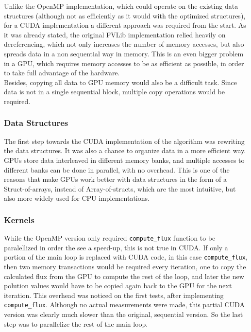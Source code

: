\documentclass[9pt,twocolumn]{scrartcl}
\begin{document}
Unlike the OpenMP implementation, which could operate on the existing data structures (although not as efficiently as it would with the optimized structures), for a CUDA implementation a different approach was required from the start. As it was already stated, the original FVLib implementation relied heavily on dereferencing, which not only increases the number of memory accesses, but also spreads data in a non sequential way in memory. This is an even bigger problem in a GPU, which requires memory accesses to be as efficient as possible, in order to take full advantage of the hardware.\\
Besides, copying all data to GPU memory would also be a difficult task. Since data is not in a single sequential block, multiple copy operations would be required.\\

\subsubsection{Data Structures}

The first step towards the CUDA implementation of the algorithm was rewriting the data structures. It was also a chance to organize data in a more efficient way. GPUs store data interleaved in different memory banks, and multiple accesses to different banks can be done in parallel, with no overhead. This is one of the reasons that make GPUs work better with data structures in the form of a Struct-of-arrays, instead of Array-of-structs, which are the most intuitive, but also more widely used for CPU implementations.\\

\subsubsection{Kernels}

While the OpenMP version only required \texttt{compute\_flux} function to be paralellized in order the see a speed-up, this is not true in CUDA. If only a portion of the main loop is replaced with CUDA code, in this case \texttt{compute\_flux}, then two memory transactions would be required every iteration, one to copy the calculated flux from the GPU to compute the rest of the loop, and later the new polution values would have to be copied again back to the GPU for the next iteration. This overhead was noticed on the first tests, after implementing \texttt{compute\_flux}. Although no actual measurements were made, this partial CUDA version was clearly much slower than the original, sequential version. So the last step was to parallelize the rest of the main loop.\\
\end{document}
